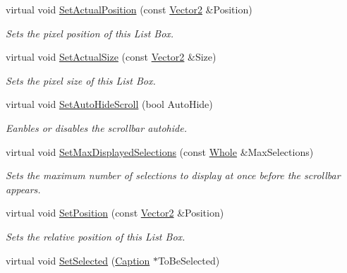 \begin{DoxyCompactItemize}
virtual void \hyperlink{classMezzanine_1_1UI_1_1ListBox_a0bf39153416d2010e5bf36601873c73e}{SetActualPosition} (const \hyperlink{classMezzanine_1_1Vector2}{Vector2} \&Position)
\begin{DoxyCompactList}\small\item\em Sets the pixel position of this List Box. \item\end{DoxyCompactList}\item 
virtual void \hyperlink{classMezzanine_1_1UI_1_1ListBox_ad277b2268dd5439c05ce300addf31815}{SetActualSize} (const \hyperlink{classMezzanine_1_1Vector2}{Vector2} \&Size)
\begin{DoxyCompactList}\small\item\em Sets the pixel size of this List Box. \item\end{DoxyCompactList}\item 
virtual void \hyperlink{classMezzanine_1_1UI_1_1ListBox_a2bbbd32e977bf60ca9c91fd8bff8a7bd}{SetAutoHideScroll} (bool AutoHide)
\begin{DoxyCompactList}\small\item\em Eanbles or disables the scrollbar autohide. \item\end{DoxyCompactList}\item 
virtual void \hyperlink{classMezzanine_1_1UI_1_1ListBox_aec97a9717ade30b67b6bdf56329da13a}{SetMaxDisplayedSelections} (const \hyperlink{namespaceMezzanine_adcbb6ce6d1eb4379d109e51171e2e493}{Whole} \&MaxSelections)
\begin{DoxyCompactList}\small\item\em Sets the maximum number of selections to display at once before the scrollbar appears. \item\end{DoxyCompactList}\item 
virtual void \hyperlink{classMezzanine_1_1UI_1_1ListBox_a7446cdc56d606fe52090e13ee8078124}{SetPosition} (const \hyperlink{classMezzanine_1_1Vector2}{Vector2} \&Position)
\begin{DoxyCompactList}\small\item\em Sets the relative position of this List Box. \item\end{DoxyCompactList}\item 
virtual void \hyperlink{classMezzanine_1_1UI_1_1ListBox_a81ddebed01b1503478c2fa7b75ce4b24}{SetSelected} (\hyperlink{classMezzanine_1_1UI_1_1Caption}{Caption} $\ast$ToBeSelected)

\end{DoxyCompactItemize}

